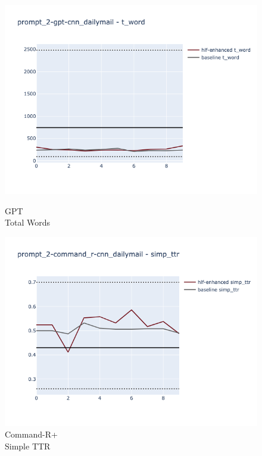 \documentclass[runningheads,a4paper,11pt]{article}
\begin{document}
\begin{figure}[ht!]
    \centering
    \begin{minipage}{0.32\textwidth}
        \includegraphics[width=\linewidth]{plots/prompt_2/prompt_2-gpt-cnn_dailymail/prompt_2-gpt-cnn_dailymail_t_word.png}
        \caption{GPT\\Total Words}
        \label{fig-p2-gpt-twords}
    \end{minipage}
    \hfill
    \begin{minipage}{0.32\textwidth}
        \includegraphics[width=\linewidth]{plots/prompt_2/prompt_2-command_r-cnn_dailymail/prompt_2-command_r-cnn_dailymail_simp_ttr.png}
        \caption{Command-R+\\Simple TTR}

\end{minipage}
\end{figure}
\end{document}
